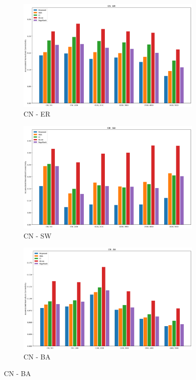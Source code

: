 \begin{figure}[hptb]
    \centering
    \begin{subfigure}{0.32\textwidth}
        \includegraphics[width=\linewidth]{ANC_CN_ER.png}
        \caption{CN - ER}
    \end{subfigure}%
    \hfill
    \begin{subfigure}{0.32\textwidth}
        \includegraphics[width=\linewidth]{ANC_CN_SW.png}
        \caption{CN - SW}
    \end{subfigure}%
    \hfill
    \begin{subfigure}{0.32\textwidth}
        \includegraphics[width=\linewidth]{ANC_CN_BA.png}
        \caption{CN - BA}
    \end{subfigure}%


\end{figure}
